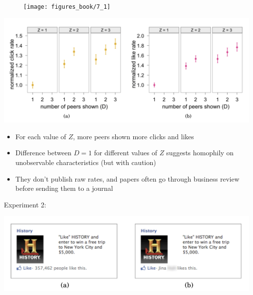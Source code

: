 \documentclass[aspectratio=169]{beamer}
\begin{document}
\begin{frame}

\begin{figure}
\texttt{[image: figures\_book/7\_1]}
\end{figure}

\end{frame}
\begin{frame}

\begin{center}
\includegraphics[width=\textwidth]{figures/bakshy_social_2012_fig3}
\end{center}

\vfill
\begin{itemize}
\item For each value of $Z$, more peers shown more clicks and likes
\item Difference between $D=1$ for different values of $Z$ suggests homophily on unobservable characteristics (but with caution)
\item They don't publish raw rates, and papers often go through business review before sending them to a journal
\end{itemize}


\end{frame}
\begin{frame}

Experiment 2:
\begin{center}
\includegraphics[width=\textwidth]{figures/bakshy_social_2012_fig4}
\end{center}

\end{frame}
\end{document}

